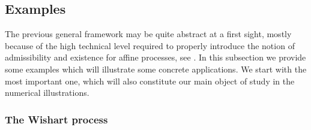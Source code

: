 \subsection{Examples}

The previous general framework may be quite abstract at a first sight, mostly because of the high technical level required to properly introduce the notion of admissibility and existence for affine processes, see \cite{article_Cuchiero}. In this subsection we provide some examples which will illustrate some concrete applications. We start with the most important one, which will also constitute our main object of study in the numerical illustrations.

\subsubsection{The Wishart process}\label{Wis_disc}


